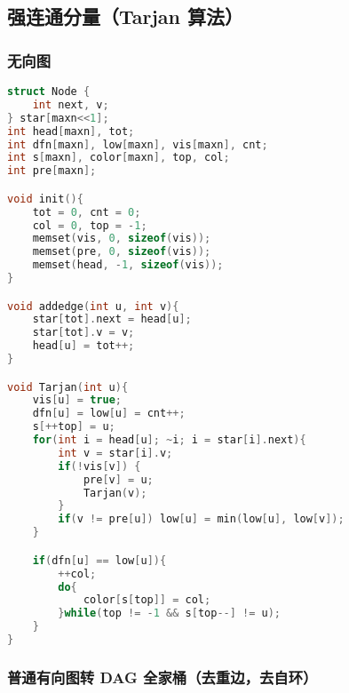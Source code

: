 \subsection{强连通分量（Tarjan 算法）}

\subsubsection{无向图}

\begin{lstlisting}[language=C++]
struct Node {
    int next, v;
} star[maxn<<1];
int head[maxn], tot;
int dfn[maxn], low[maxn], vis[maxn], cnt;
int s[maxn], color[maxn], top, col;
int pre[maxn];

void init(){
    tot = 0, cnt = 0;
    col = 0, top = -1;
    memset(vis, 0, sizeof(vis));
    memset(pre, 0, sizeof(vis));
    memset(head, -1, sizeof(vis));
}

void addedge(int u, int v){
    star[tot].next = head[u];
    star[tot].v = v;
    head[u] = tot++;
}

void Tarjan(int u){
    vis[u] = true;
    dfn[u] = low[u] = cnt++;
    s[++top] = u;
    for(int i = head[u]; ~i; i = star[i].next){
        int v = star[i].v;
        if(!vis[v]) {
            pre[v] = u;
            Tarjan(v);
        }
        if(v != pre[u]) low[u] = min(low[u], low[v]);
    }

    if(dfn[u] == low[u]){
        ++col;
        do{
            color[s[top]] = col;
        }while(top != -1 && s[top--] != u);
    }
}
\end{lstlisting}

\subsubsection{普通有向图转 DAG 全家桶（去重边，去自环）}

